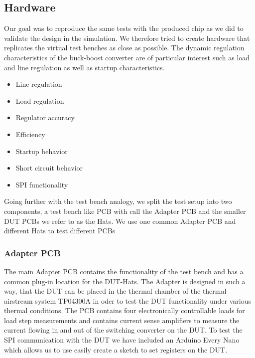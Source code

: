 \subsection{Hardware}
Our goal was to reproduce the same tests with the produced chip as we did to validate the design in the simulation. We therefore tried to create hardware that replicates the virtual test benches as close as possible. The dynamic regulation characteristics of the buck-boost converter are of particular interest such as load and line regulation as well as startup characteristics. 

\begin{itemize}
    \item Line regulation
    \item Load regulation
    \item Regulator accuracy 
    \item Efficiency
    \item Startup behavior
    \item Short circuit behavior
    \item SPI functionality
\end{itemize}

Going further with the test bench analogy, we split the test setup into two components, a test bench like PCB with call the Adapter PCB and the smaller \ac{DUT} PCBs we refer to as the Hats. We use one common Adapter PCB and different Hats to test different PCBs 


\subsubsection{Adapter PCB}
The main Adapter PCB contains the functionality of the test bench and has a common plug-in location for the DUT-Hats. The Adapter is designed in such a way, that the \ac{DUT} can be placed in the thermal chamber of the thermal airstream system TP04300A in oder to test the DUT functionality under various thermal conditions. The PCB contains four electronically controllable loads for load step measurements and contains current sense amplifiers to measure the current flowing in and out of the switching converter on the DUT. To test the SPI communication with the DUT we have included an Arduino Every Nano which allows us to use easily create a sketch to set registers on the DUT.


